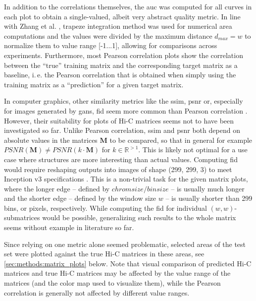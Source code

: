 In addition to the correlations themselves, the \acrfull{auc} was computed for all curves in each plot 
to obtain a single-valued, albeit very abstract quality metric.
In line with Zhang et al. \cite{Zhang2019}, trapeze integration method was used for numerical area computations
and the values were divided by the maximum distance $d_\mathit{max} = w$ to normalize them to value range [-1...1],
allowing for comparisons across experiments.
Furthermore, most Pearson correlation plots show the correlation between the ``true'' training matrix and the corresponding target matrix as a baseline,
i.\,e. the Pearson correlation that is obtained when simply using the training matrix as a ``prediction'' for a given target matrix.

In computer graphics, other similarity metrics like the \acrfull{ssim}, \acrfull{psnr} or, especially for images generated by \acrshort{gan}s, 
\acrfull{fid} seem more common than Pearson correlation \cite[p.\,19\,ff.]{Wang2020}.
However, their suitability for plots of Hi-C matrices seems not to have been investigated so far. 
Unlike Pearson correlation, \acrshort{ssim} and \acrshort{psnr} both depend on absolute values in the matrices $\mathbf{M}$ to be compared, 
so that in general for example $\mathit{PSNR}(\mathbf{M}) \not=\mathit{PSNR}(k\cdot \mathbf{M})$ for $k\in\mathbb{R}^{>1}$.
This is likely not optimal for a use case where structures are more interesting than actual values.
Computing \acrshort{fid} would require reshaping outputs into images of shape (299, 299, 3) to meet Inception v3 specifications \cite{Szegedy2016}.
This is a non-trivial task for the given matrix plots,
where the longer edge -- defined by $\mathit{chromsize}/\mathit{binsize}$ -- is usually much longer 
and the shorter edge -- defined by the window size $w$ -- is usually shorter than 299 bins, or pixels, respectively.
While computing the \acrshort{fid} for individual $(w,w)$-submatrices would be possible,
generalizing such results to the whole matrix seems without example in literature so far.

Since relying on one metric alone seemed problematic, selected areas of the test set were plotted against the true 
Hi-C matrices in these areas, see \cref{sec:methods:matrix_plots} below.
Note that visual comparison of predicted Hi-C matrices and true Hi-C matrices may be affected by
the value range of the matrices (and the color map used to visualize them), while the Pearson correlation is generally not affected by different
value ranges.

